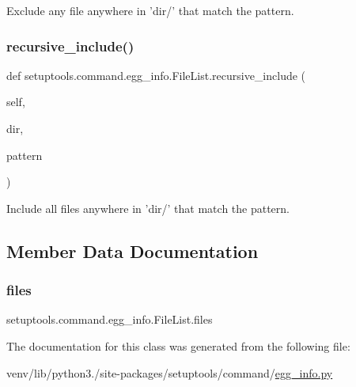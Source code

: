 \begin{DoxyVerb}Exclude any file anywhere in 'dir/' that match the pattern.
\end{DoxyVerb}
 \mbox{\label{classsetuptools_1_1command_1_1egg__info_1_1FileList_a287e9bf1901bbc7fe07e6018227e8493}} 
\subsubsection{\texorpdfstring{recursive\+\_\+include()}{recursive\_include()}}
{\footnotesize\ttfamily def setuptools.\+command.\+egg\+\_\+info.\+File\+List.\+recursive\+\_\+include (\begin{DoxyParamCaption}\item[{}]{self,  }\item[{}]{dir,  }\item[{}]{pattern }\end{DoxyParamCaption})}

\begin{DoxyVerb}Include all files anywhere in 'dir/' that match the pattern.
\end{DoxyVerb}
 

\subsection{Member Data Documentation}
\mbox{\label{classsetuptools_1_1command_1_1egg__info_1_1FileList_a5f5f8c4a6db4580cf53125d54a15d75a}} 
\subsubsection{\texorpdfstring{files}{files}}
{\footnotesize\ttfamily setuptools.\+command.\+egg\+\_\+info.\+File\+List.\+files}



The documentation for this class was generated from the following file\+:\begin{DoxyCompactItemize}
\item 
venv/lib/python3./site-\/packages/setuptools/command/\hyperlink{setuptools_2command_2egg__info_8py}{egg\+\_\+info.\+py}\end{DoxyCompactItemize}
